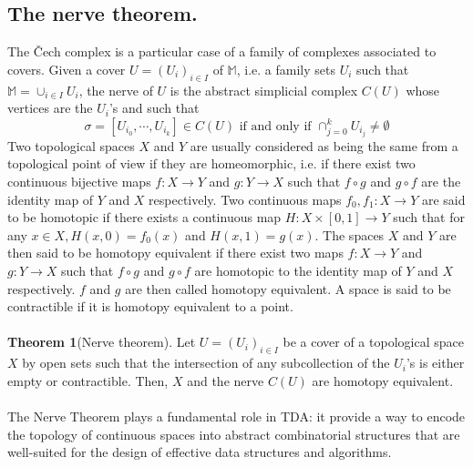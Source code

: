 \subsection{The nerve theorem. }The Čech complex is a particular case of a family of complexes associated to covers. Given a cover $U = (U_i)_{i\in I}$ of $\mathbb{M}$, i.e. a family sets $U_i$ such that $\mathbb{M} = \cup_{i\in I}U_i$, the nerve of $U$ is the abstract simplicial complex $C(U)$ whose vertices are the $U_i$'s and such that \[\sigma = [U_{i_0},\cdots, U_{i_k}]\in C(U) \text{ if and only if } \cap_{j=0}^kU_{i_j}\neq \emptyset\]
Two topological spaces $X$ and $Y$ are usually considered as being the same from a topological point of view if they are homeomorphic, i.e. if there exist two continuous bijective maps $f : X \rightarrow Y$ and $g : Y \rightarrow X$ such that $f \circ g$ and $g \circ f$ are the identity map of $Y$ and $X$ respectively. Two continuous maps $f_0,f_1: X \rightarrow Y$ are said to be homotopic if there exists a continuous map $H: X\times [0,1] \rightarrow Y$ such that for any $x \in X, H(x,0) = f_0(x)$ and $H(x,1) = g(x)$. The spaces $X$ and $Y$ are then said to be homotopy equivalent if there exist two maps $f : X \rightarrow Y$ and $g : Y \rightarrow X$ such that $f \circ g$ and $g \circ f$ are homotopic to the identity map of $Y$ and $X$ respectively. $f$ and $g$ are then called homotopy equivalent. A space is said to be contractible if it is homotopy equivalent to a point.\\\\
\textbf{Theorem 1}(Nerve theorem). Let $U = (U_i)_{i\in I}$ be a cover of a topological space $X$ by open sets such that the intersection of any subcollection of the $U_i$'s is either empty or contractible. Then, $X$ and the nerve $C(U)$ are homotopy equivalent.\\\\
The Nerve Theorem plays a fundamental role in TDA: it provide a way to encode the topology
of continuous spaces into abstract combinatorial structures that are well-suited for the design of effective data structures and algorithms.